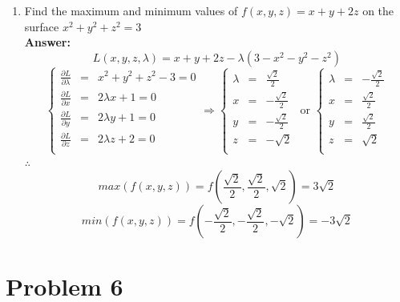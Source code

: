 \documentclass[letterpaper,11pt]{article}
\begin{document}
\begin{enumerate}
\item Find the maximum and minimum values of $f(x,y,z) = x + y + 2z$ on the surface $x^2 + y^2 + z^2 = 3$\\
\textbf{Answer:}
$$L(x,y,z,\lambda)=x + y + 2z - \lambda(3-x^2 - y^2 - z^2)$$
\begin{equation}
\nonumber
\left\{\begin{array}{rcl}
\frac{\partial L}{\partial \lambda} & = & x^2 + y^2 + z^2 -3 =0 \\
\frac{\partial L}{\partial x} & = & 2 \lambda x +1 =0 \\
\frac{\partial L}{\partial y} & = & 2 \lambda y +1 =0 \\
\frac{\partial L}{\partial z} & = & 2 \lambda z +2 =0 \\
\end{array}
\right. \Rightarrow \left\{\begin{array}{rcl}
\lambda & = & \frac{\sqrt{2}}{2} \\
x & = & -\frac{\sqrt{2}}{2} \\
y & = & -\frac{\sqrt{2}}{2} \\
z & = & -\sqrt{2} \\
\end{array}
\right. \text{ or } \left\{\begin{array}{rcl}
\lambda & = & -\frac{\sqrt{2}}{2} \\
x & = & \frac{\sqrt{2}}{2} \\
y & = & \frac{\sqrt{2}}{2} \\
z & = & \sqrt{2} \\
\end{array}
\right.
\end{equation}
$\therefore$
$$max(f(x,y,z))=f(\frac{\sqrt{2}}{2},\frac{\sqrt{2}}{2},\sqrt{2})=3\sqrt{2}$$
$$min(f(x,y,z))=f(-\frac{\sqrt{2}}{2},-\frac{\sqrt{2}}{2},-\sqrt{2})=-3\sqrt{2}$$

\end{enumerate}

\newpage

\section*{Problem 6}
\end{document}
